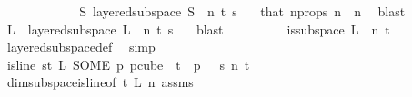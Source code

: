 \begin{isabellebody}
\ \ \ \ \isamarkupfalse%
{\isacharminus}{\kern0pt}\isanewline
\ \ \ \ \ \ \isamarkupfalse%
\ {\isachardoublequoteopen}{\isasymexists}S{\isachardot}{\kern0pt}\ layered{\isacharunderscore}{\kern0pt}subspace\ S\ {}\ n\ t\ s\ {\isasymchi}{\isachardoublequoteclose}\ \isamarkupfalse%
\ that\ n{\isacharprime}{\kern0pt}{\isacharunderscore}{\kern0pt}props\ {\isacartoucheopen}n\ {\isasymge}\ n{\isacharprime}{\kern0pt}{\isacartoucheclose}\ \isamarkupfalse%
\ blast\isanewline
\ \ \ \ \ \ \isamarkupfalse%
\ \isamarkupfalse%
\ L\ \ {\isachardoublequoteopen}layered{\isacharunderscore}{\kern0pt}subspace\ L\ {}\ n\ t\ s\ {\isasymchi}{\isachardoublequoteclose}\ \isamarkupfalse%
\ blast\isanewline
\ \ \ \ \ \ \isamarkupfalse%
\ \isamarkupfalse%
\ {\isachardoublequoteopen}is{\isacharunderscore}{\kern0pt}subspace\ L\ {}\ n\ {\isacharparenleft}{\kern0pt}t{\isacharplus}{\kern0pt}{}{\isacharparenright}{\kern0pt}{\isachardoublequoteclose}\ \isamarkupfalse%
\ layered{\isacharunderscore}{\kern0pt}subspace{\isacharunderscore}{\kern0pt}def\ \isamarkupfalse%
\ simp\isanewline
\ \ \ \ \ \ \isamarkupfalse%
\ \isamarkupfalse%
\ {\isachardoublequoteopen}is{\isacharunderscore}{\kern0pt}line\ {\isacharparenleft}{\kern0pt}{\isasymlambda}s{\isasymin}{\isacharbraceleft}{\kern0pt}{\isachardot}{\kern0pt}{\isachardot}{\kern0pt}{\isacharless}{\kern0pt}t{\isacharplus}{\kern0pt}{}{\isacharbraceright}{\kern0pt}{\isachardot}{\kern0pt}\ L\ {\isacharparenleft}{\kern0pt}SOME\ p{\isachardot}{\kern0pt}\ p{\isasymin}cube\ {}\ {\isacharparenleft}{\kern0pt}t{\isacharplus}{\kern0pt}{}{\isacharparenright}{\kern0pt}\ {\isasymand}\ p\ {}\ {\isacharequal}{\kern0pt}\ s{\isacharparenright}{\kern0pt}{\isacharparenright}{\kern0pt}\ n\ {\isacharparenleft}{\kern0pt}t\ {\isacharplus}{\kern0pt}\ {}{\isacharparenright}{\kern0pt}{\isachardoublequoteclose}\ \isanewline
\ \ \ \ \ \ \ \ \isamarkupfalse%
\ dim{}{\isacharunderscore}{\kern0pt}subspace{\isacharunderscore}{\kern0pt}is{\isacharunderscore}{\kern0pt}line{\isacharbrackleft}{\kern0pt}of\ {\isachardoublequoteopen}t{\isacharplus}{\kern0pt}{}{\isachardoublequoteclose}\ {\isachardoublequoteopen}L{\isachardoublequoteclose}\ {\isachardoublequoteopen}n{\isachardoublequoteclose}{\isacharbrackright}{\kern0pt}\ assms{\isacharparenleft}{\kern0pt}{}{\isacharparenright}{\kern0pt}\ \isamarkupfalse%

\end{isabellebody}
